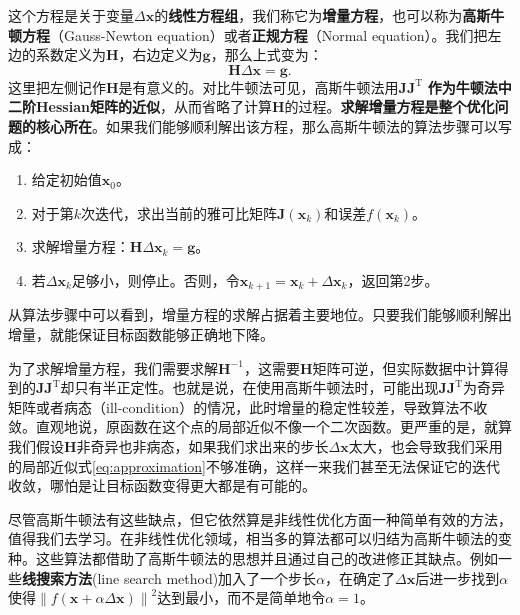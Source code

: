 这个方程是关于变量$\Delta \bm{x}$的\textbf{线性方程组}，我们称它为\textbf{增量方程}，也可以称为\textbf{高斯牛顿方程}（Gauss-Newton equation）或者\textbf{正规方程}（Normal equation）。我们把左边的系数定义为$\bm{H}$，右边定义为$\bm{g}$，那么上式变为：
\begin{equation}
\label{eq:minimize-deltax}
\bm{H} \Delta \bm{x} = \bm{g}.
\end{equation}
这里把左侧记作$\bm{H}$是有意义的。对比牛顿法可见，高斯牛顿法用$\bm{J}\bm{J}^\mathrm{T}$ \textbf{作为牛顿法中二阶Hessian矩阵的近似}，从而省略了计算$\bm{H}$的过程。\textbf{求解增量方程是整个优化问题的核心所在}。如果我们能够顺利解出该方程，那么高斯牛顿法的算法步骤可以写成：

\begin{mdframed}
	\begin{enumerate}
		\item 给定初始值$\bm{x}_0$。
		\item 对于第$k$次迭代，求出当前的雅可比矩阵$\bm{J}(\bm{x}_k)$和误差$f(\bm{x}_k)$。
		\item 求解增量方程：$\bm{H} \Delta \bm{x}_k = \bm{g}$。
		\item 若$\Delta \bm{x}_k$足够小，则停止。否则，令$\bm{x}_{k+1} = \bm{x}_k+\Delta \bm{x}_k$，返回第2步。
	\end{enumerate}
\end{mdframed}

从算法步骤中可以看到，增量方程的求解占据着主要地位。只要我们能够顺利解出增量，就能保证目标函数能够正确地下降。

为了求解增量方程，我们需要求解$\bm{H}^{-1}$，这需要$\bm{H}$矩阵可逆，但实际数据中计算得到的$\bm{J} \bm{J}^\mathrm{T}$却只有半正定性。也就是说，在使用高斯牛顿法时，可能出现$\bm{J}\bm{J}^\mathrm{T}$为奇异矩阵或者病态（ill-condition）的情况，此时增量的稳定性较差，导致算法不收敛。直观地说，原函数在这个点的局部近似不像一个二次函数。更严重的是，就算我们假设$\bm{H}$非奇异也非病态，如果我们求出来的步长$\Delta \bm{x}$太大，也会导致我们采用的局部近似式\eqref{eq:approximation}不够准确，这样一来我们甚至无法保证它的迭代收敛，哪怕是让目标函数变得更大都是有可能的。

尽管高斯牛顿法有这些缺点，但它依然算是非线性优化方面一种简单有效的方法，值得我们去学习。在非线性优化领域，相当多的算法都可以归结为高斯牛顿法的变种。这些算法都借助了高斯牛顿法的思想并且通过自己的改进修正其缺点。例如一些\textbf{线搜索方法}(line search method)加入了一个步长$\alpha$，在确定了$\Delta \bm{x}$后进一步找到$\alpha$使得$\left\| f(\bm{x} + \alpha \Delta \bm{ x}) \right\|^2$达到最小，而不是简单地令$\alpha = 1$。

